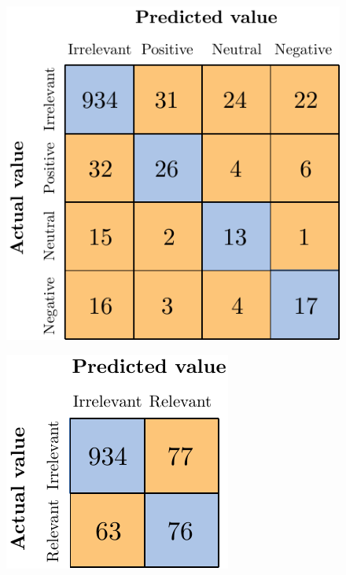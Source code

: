 \begin{figure}[H]
	\centering
	\includegraphics[scale=1]{figures/conf_matrices/ita_exteriors/ita_cascade_exteriors_bpef_val.pdf}
	\label{fig:ita_cascade_exteriors_bpef_val}
\end{figure}


\begin{figure}[H]
	\centering
	\includegraphics[scale=1]{figures/conf_matrices/ita_exteriors/ita_rel_exteriors_logreg_afs.pdf}
	\label{fig:ita_rel_exteriors_logreg_afs}
\end{figure}


